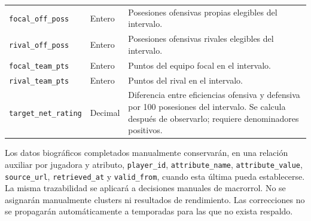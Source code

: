 \begin{longtable}{@{}>{\raggedright\arraybackslash}p{5.0cm}>{\raggedright\arraybackslash}p{1.9cm}>{\raggedright\arraybackslash}p{7.7cm}@{}}
\texttt{focal\_\allowbreak off\_\allowbreak poss} & Entero & Posesiones ofensivas propias elegibles del intervalo.\\
\texttt{rival\_\allowbreak off\_\allowbreak poss} & Entero & Posesiones ofensivas rivales elegibles del intervalo.\\
\texttt{focal\_\allowbreak team\_\allowbreak pts} & Entero & Puntos del equipo focal en el intervalo.\\
\texttt{rival\_\allowbreak team\_\allowbreak pts} & Entero & Puntos del rival en el intervalo.\\
\texttt{target\_\allowbreak net\_\allowbreak rating} & Decimal & Diferencia entre eficiencias ofensiva y defensiva por 100 posesiones del intervalo. Se calcula después de observarlo; requiere denominadores positivos.\\
\end{longtable}
\endgroup
Los datos biográficos completados manualmente conservarán, en una relación auxiliar por jugadora y atributo, \texttt{player\_id}, \texttt{attribute\_name}, \texttt{attribute\_value}, \texttt{source\_url}, \texttt{retrieved\_at} y \texttt{valid\_from}, cuando esta última pueda establecerse. La misma trazabilidad se aplicará a decisiones manuales de macrorrol. No se asignarán manualmente clusters ni resultados de rendimiento. Las correcciones no se propagarán automáticamente a temporadas para las que no exista respaldo.
